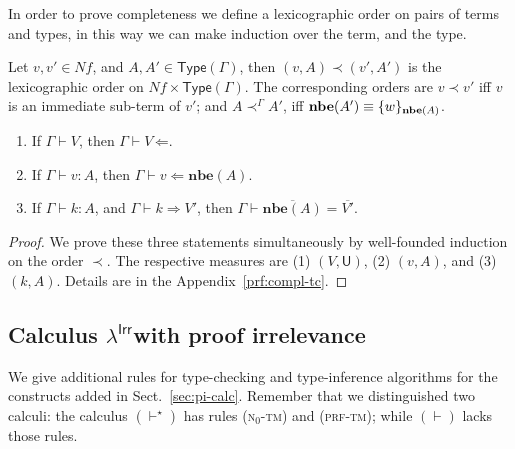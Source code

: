 \documentclass{LMCS}
\theoremstyle{plain}\newtheorem{satz}[thm]{Satz}
\newcommand{\LONGVERSION}[1]{#1}
\newcommand{\SHORTVERSION}[1]{}
\newcommand{\lambdaPI}{\texorpdfstring{\ensuremath{\lambda^{\mathsf{Irr}}}}{Proof-irrelevance}}
\newcommand{\type}[1]{\mathsf{Type}(#1)}
\newcommand{\TmU}{\mathsf{U}}
\newcommand{\dtype}[2]{#1\vdash#2}
\newcommand{\dterm}[3]{#1\vdash#3:#2}
\newcommand{\deqtype}[3]{#1\vdash#2=#3}
\newcommand{\vdashp}{\vdash^{\oprf}}\newcommand{\sdctx}[1]{#1\vdashp}
\newcommand{\ertype}[1]{\overline{#1}}
\newcommand{\nfterms}{\mathit{Nf}}
\newcommand{\chktype}[2]{#1 \vdash #2\, \mathord{\Leftarrow}}
\newcommand{\chkterm}[3]{#1\vdash#3\Leftarrow #2}
\newcommand{\inftype}[3]{#1\vdash #2\Rightarrow #3}
\newcommand{\nbe}[1]{\mathbf{nbe}(#1)}
\newcommand{\oprf}{\dprf}
\newcommand{\dprf}{\star}
\newcommand{\enumrule}[2][n]{n\ensuremath{_{#1}}-{#2}}
\newcommand{\LONGVERSION}[1]{}
\newcommand{\SHORTVERSION}[1]{#1}
\newcommand{\LONGSHORT}[2]{\LONGVERSION{#1}\SHORTVERSION{#2}}
\newcommand{\PrfIrrTitle}{\subsection{Calculus \lambdaPI with proof irrelevance}}
\begin{document}
In order to prove completeness we define a lexicographic order on
pairs of terms and types, in this way we can make induction over the
term, and the type.
  
\begin{defi}
  \label{def:wf-compl}
  Let $v, v' \in \nfterms$, and $A, A' \in \type{\Gamma}$, then $(v,A)
  \prec (v',A')$ is the lexicographic order on $\nfterms \times
  \type{\Gamma}$. The corresponding orders are $v \prec v'$ iff $v$ is
  an immediate sub-term of $v'$; and $A \prec^{\Gamma} A'$, iff
  $\nbe{A'} \equiv \singTm{w}{\nbe{A}}$.
\end{defi}
  
  \begin{thm}\hfill
    \label{thm:compl-tc}
    \begin{enumerate}[\em(1)]
    \item If $\dtype{\Gamma}{V}$, then $\chktype{\Gamma}{V}$.
    \item If $\dterm{\Gamma}{A}{v}$, then
      $\chkterm{\Gamma}{\nbe{A}}{v}$.
    \item If $\dterm{\Gamma}{A}{k}$, and $\inftype{\Gamma}{k}{V'}$,
      then $\deqtype{\Gamma}{\ertype{\nbe{A}}}{\ertype{V'}}$.
    \end{enumerate}
  \end{thm}
\LONGSHORT{
  \begin{proof}
    We prove these three statements simultaneously by well-founded
    induction on the order $\prec$.  The respective measures are (1)
    $(V,\TmU)$, (2) $(v,A)$, and (3) $(k,A)$.
    Details are in the Appendix~\ref{prf:compl-tc}.
\end{proof}
}
{
  \begin{proof}
    By simultaneous induction on $V$, and well-founded induction on
    $(v,A)$.
  \end{proof}
}




\PrfIrrTitle

\LONGSHORT{

  We give additional rules for type-checking and type-inference
  algorithms for the constructs added in
  Sect.~\ref{sec:pi-calc}. Remember that we distinguished two calculi:
  the calculus $(\vdashp)$ has rules (\textsc{\enumrule[0]tm}) and
  (\textsc{prf-tm}); while $(\vdash)$ lacks those rules.





}{
}
\end{document}
